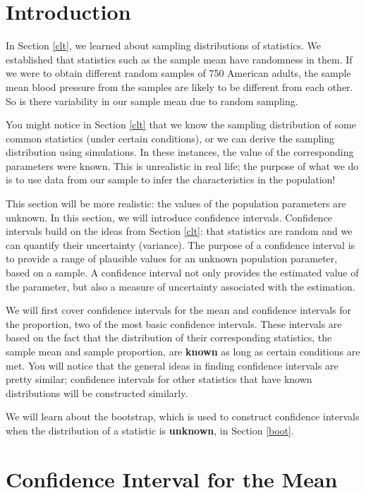 \documentclass[
]{book}
\theoremstyle{definition}
\theoremstyle{definition}
\theoremstyle{definition}
\theoremstyle{definition}
\theoremstyle{remark}
\begin{document}
\hypertarget{introduction-2}{%
\section{Introduction}\label{introduction-2}}

In Section \ref{clt}, we learned about sampling distributions of statistics. We established that statistics such as the sample mean have randomness in them. If we were to obtain different random samples of 750 American adults, the sample mean blood pressure from the samples are likely to be different from each other. So is there variability in our sample mean due to random sampling.

You might notice in Section \ref{clt} that we know the sampling distribution of some common statistics (under certain conditions), or we can derive the sampling distribution using simulations. In these instances, the value of the corresponding parameters were known. This is unrealistic in real life; the purpose of what we do is to use data from our sample to infer the characteristics in the population!

This section will be more realistic: the values of the population parameters are unknown. In this section, we will introduce confidence intervals. Confidence intervals build on the ideas from Section \ref{clt}: that statistics are random and we can quantify their uncertainty (variance). The purpose of a confidence interval is to provide a range of plausible values for an unknown population parameter, based on a sample. A confidence interval not only provides the estimated value of the parameter, but also a measure of uncertainty associated with the estimation.

We will first cover confidence intervals for the mean and confidence intervals for the proportion, two of the most basic confidence intervals. These intervals are based on the fact that the distribution of their corresponding statistics, the sample mean and sample proportion, are \textbf{known} as long as certain conditions are met. You will notice that the general ideas in finding confidence intervals are pretty similar; confidence intervals for other statistics that have known distributions will be constructed similarly.

We will learn about the bootstrap, which is used to construct confidence intervals when the distribution of a statistic is \textbf{unknown}, in Section \ref{boot}.

\hypertarget{CImean}{%
\section{Confidence Interval for the Mean}\label{CImean}}
\end{document}

